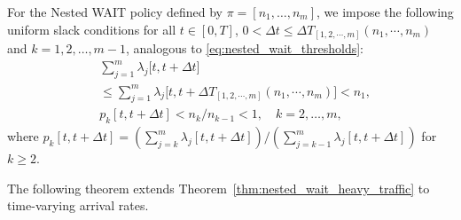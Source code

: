 For the Nested WAIT policy defined by $\pi = [n_1, \dots, n_m]$, we impose the following uniform slack conditions for all $t\in [0, T]$, $0<\Delta t\leq \Delta T_{[1,2,\cdots,m]}(n_1,\cdots,n_m)$ and $k = 1, 2, \dots, m-1$, analogous to \eqref{eq:nested_wait_thresholds}:
\begin{equation}
    \label{eq:nested_wait_thresholds_time_varying}
\begin{aligned}
        & \sum_{j=1}^m \lambda_j\big[t, t + \Delta t\big] \\&\leq \sum_{j=1}^m \lambda_j\big[t, t +\Delta T_{[1,2,\cdots,m]}(n_1,\cdots,n_m)\big]< n_1, \\
        & p_k[t,t+\Delta t] < n_k/n_{k-1} < 1,\quad k=2,\dots,m,
\end{aligned}
\end{equation}
where $p_k[t,t+\Delta t] = (\sum_{j=k}^m\lambda_j[t,t+\Delta t])/(\sum_{j=k-1}^m\lambda_j[t,t+\Delta t])$ for \(k\ge2\).

The following theorem extends Theorem~\ref{thm:nested_wait_heavy_traffic} to time-varying arrival rates.

